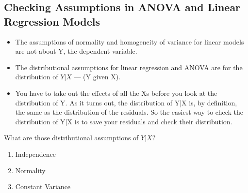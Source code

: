 \documentclass[residuals.tex]{subfiles}
\begin{document}
	
	\Large
	
	
	
\subsection{Checking Assumptions in ANOVA and Linear Regression Models}
%
\begin{itemize}
\item The assumptions of normality and homogeneity of variance for linear models are not about Y, the dependent variable.  


\item The distributional assumptions for linear regression and ANOVA are for the distribution of $Y|X$ — (Y given X).  

\item You have to take out the effects of all the Xs before you look at the distribution of Y.  As it turns out, the distribution of Y|X is, by definition, the same as the distribution of the residuals.  So the easiest way to check the distribution of Y|X is to save your residuals and check their distribution.



%
\end{itemize}
\bigskip
What are those distributional assumptions of $Y|X$?


\begin{enumerate}
\item Independence

\item Normality

\item Constant Variance

\end{enumerate}
\end{document}
